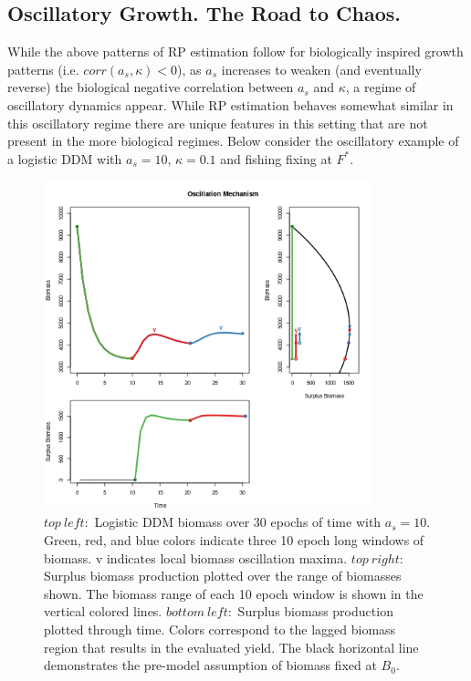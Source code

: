 \subsection{Oscillatory Growth. The Road to Chaos.\label{oscillation}}

%
While the above patterns of RP estimation follow for biologically inspired 
growth patterns (i.e. $corr(a_s, \kappa)<0$),
as $a_s$ increases to weaken (and eventually reverse) the biological negative 
correlation between $a_s$ and $\kappa$, a regime of oscillatory dynamics appear. %
While RP estimation behaves somewhat similar in this oscillatory regime there 
are unique features in this setting that are not present in the more biological 
regimes. Below consider the oscillatory example of a logistic DDM with 
$a_s=10$, $\kappa=0.1$ and fishing fixing at $F^*$.

\begin{figure}[h!]
\centering
\includegraphics[width=0.85\textwidth]{../ddBias/shockBiomassSurplus.png}%
\vspace{-0.5cm}
\caption{$top~left:$ Logistic DDM biomass over 30 epochs of time with $a_s=10$.
Green, red, and blue colors indicate three 10 epoch long windows of biomass.
v indicates local biomass oscillation maxima.
$top~right:$ %
Surplus biomass production plotted over the range of biomasses shown.
The biomass range of each 10 epoch window is shown in the vertical colored lines.
$bottom~left:$ %
Surplus biomass production plotted through time. Colors correspond to the
lagged biomass region that results in the evaluated yield. The black horizontal
line demonstrates the pre-model assumption of biomass fixed at $B_0$.
}
\label{shock}
\end{figure}

